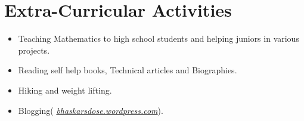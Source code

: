 \documentclass[10pt]{report}
\begin{document}
\section*{\color{BlueViolet}\faPencil\hspace{1pt} Extra-Curricular Activities} 
\begin{itemize}
\vspace{-1em}\item Teaching Mathematics to high school students and helping juniors in various projects.
    \item Reading self help books, Technical articles and Biographies.
    \item Hiking and weight lifting.
    \item Blogging( \href{https://bhaskarsdose.wordpress.com/}{\color{gray}\textit{bhaskarsdose.wordpress.com}}).\vspace{-1em}
\end{itemize}

\end{document}
